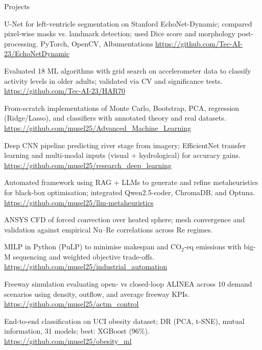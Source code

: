 \begin{rubric}{Projects}
\noentry{~}

U-Net for left-ventricle segmentation on Stanford EchoNet-Dynamic; compared pixel-wise masks vs. landmark detection; used Dice score and morphology post-processing.\hfill {} PyTorch, OpenCV, Albumentations\hfill {} \url{https://github.com/Tec-AI-23/EchoNetDynamic}

Evaluated 18 ML algorithms with grid search on accelerometer data to classify activity levels in older adults; validated via CV and significance tests.\hfill {} \url{https://github.com/Tec-AI-23/HAR70}

From-scratch implementations of Monte Carlo, Bootstrap, PCA, regression (Ridge/Lasso), and classifiers with annotated theory and real datasets.\hfill {} \url{https://github.com/musel25/Advanced_Machine_Learning}

Deep CNN pipeline predicting river stage from imagery; EfficientNet transfer learning and multi-modal inputs (visual + hydrological) for accuracy gains.\hfill {} \url{https://github.com/musel25/research_deep_learning}

Automated framework using RAG + LLMs to generate and refine metaheuristics for black-box optimisation; integrated Qwen2.5-coder, ChromaDB, and Optuna.\hfill {} \url{https://github.com/musel25/llm-metaheuristics}

ANSYS CFD of forced convection over heated sphere; mesh convergence and validation against empirical Nu–Re correlations across Re regimes.

MILP in Python (PuLP) to minimise makespan and CO$_2$-eq emissions with big-M sequencing and weighted objective trade-offs.\hfill {} \url{https://github.com/musel25/industrial_automation}

Freeway simulation evaluating open- vs closed-loop ALINEA across 10 demand scenarios using density, outflow, and average freeway KPIs.\hfill {} \url{https://github.com/musel25/actm_control}

End-to-end classification on UCI obesity dataset; DR (PCA, t-SNE), mutual information, 31 models; best: XGBoost (96\%).\hfill {} \url{https://github.com/musel25/obesity_ml}


\end{rubric}
